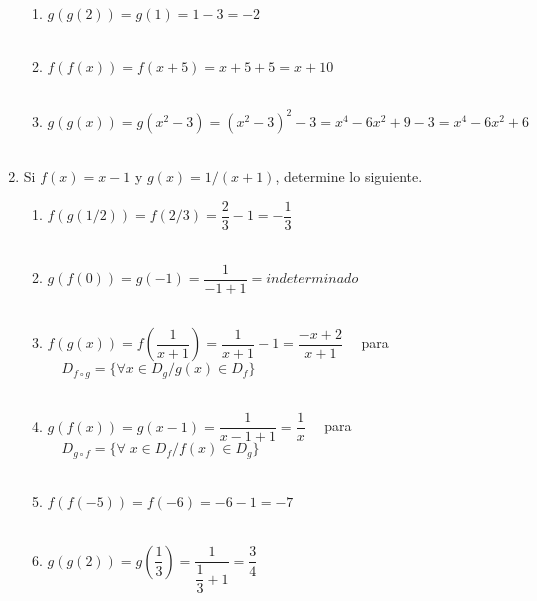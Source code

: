 \begin{enumerate}
\begin{enumerate}[\bfseries a.]
    \item $g(g(2)) = g(1) = 1 - 3 = -2$\\\\

    \item $f(f(x)) = f(x+5) = x+ 5 + 5 = x + 10$\\\\

    \item $g(g(x)) = g(x^2-3) = (x^2 - 3)^2 - 3 = x^4 - 6x^2 + 9 - 3 = x^4 - 6x^2 + 6$\\\\

\end{enumerate}

\item Si $f(x)=x-1$ y $g(x)=1/(x+1)$, determine lo siguiente.
\begin{enumerate}[\bfseries a.]
    
    \item $f(g(1/2))= f(2/3) = \dfrac{2}{3} - 1 = -\dfrac{1}{3}$\\\\
    
    \item $g(f(0)) = g(-1) = \dfrac{1}{-1+1} = indeterminado$\\\\
    
    \item $f(g(x)) = f\left(\dfrac{1}{x+1}\right) = \dfrac{1}{x+1} - 1 = \dfrac{-x+2}{x+1} \quad $ para $\quad D_{f\circ g} = \lbrace \forall x \in D_g / g(x) \in D_f\rbrace$ \\\\
    
    \item $g(f(x)) = g(x-1) = \dfrac{1}{x -1 + 1} = \dfrac{1}{x} \quad $ para $\quad D_{g\circ f} = \lbrace \forall\; x \in D_f / f(x) \in D_g \rbrace$\\\\
    
    \item $f(f(-5)) = f(-6) = -6 - 1 = -7$\\\\
    
    \item $g(g(2)) = g\left(\dfrac{1}{3}\right) = \dfrac{1}{\dfrac{1}{3} + 1} = \dfrac{3}{4}$\\\\
    

\end{enumerate}
\end{enumerate}
